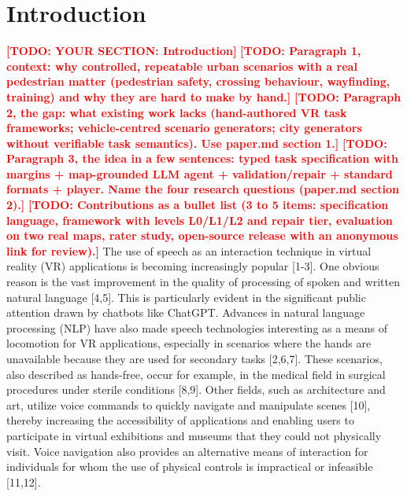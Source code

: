 \documentclass[preprint,12pt]{elsarticle}
\newcommand{\reftext}[1]{{\color{gray}#1}}   %
\newcommand{\todo}[1]{\textcolor{red}{\textbf{[TODO: #1]}}}
\begin{document}
\section{Introduction}
\todo{YOUR SECTION: Introduction}
\todo{Paragraph 1, context: why controlled, repeatable urban scenarios with a real pedestrian matter (pedestrian safety, crossing behaviour, wayfinding, training) and why they are hard to make by hand.}
\todo{Paragraph 2, the gap: what existing work lacks (hand-authored VR task frameworks; vehicle-centred scenario generators; city generators without verifiable task semantics). Use paper.md section 1.}
\todo{Paragraph 3, the idea in a few sentences: typed task specification with margins + map-grounded LLM agent + validation/repair + standard formats + player. Name the four research questions (paper.md section 2).}
\todo{Contributions as a bullet list (3 to 5 items: specification language, framework with levels L0/L1/L2 and repair tier, evaluation on two real maps, rater study, open-source release with an anonymous link for review).}
\reftext{The use of speech as an interaction technique in virtual reality (VR) applications is becoming increasingly popular [1-3]. One obvious reason is the vast improvement in the quality of processing of spoken and written natural language [4,5]. This is particularly evident in the significant public attention drawn by chatbots like ChatGPT. Advances in natural language processing (NLP) have also made speech technologies interesting as a means of locomotion for VR applications, especially in scenarios where the hands are unavailable because they are used for secondary tasks [2,6,7]. These scenarios, also described as hands-free, occur for example, in the medical field in surgical procedures under sterile conditions [8,9]. Other fields, such as architecture and art, utilize voice commands to quickly navigate and manipulate scenes [10], thereby increasing the accessibility of applications and enabling users to participate in virtual exhibitions and museums that they could not physically visit. Voice navigation also provides an alternative means of interaction for individuals for whom the use of physical controls is impractical or infeasible [11,12].}
\end{document}
